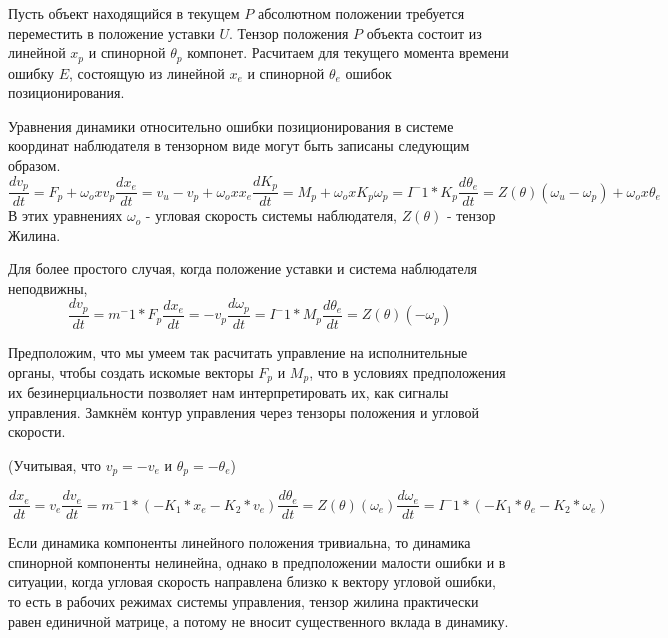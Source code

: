 \documentclass[a4paper]{article}
\begin{document}
Пусть объект находящийся в текущем $P$ абсолютном положении требуется переместить в положение уставки $U$.
Тензор положения $P$ объекта состоит из линейной $x_p$ и спинорной $\theta_p$ компонет. Расчитаем для текущего момента времени ошибку $E$, состоящую из линейной $x_e$ и спинорной $\theta_e$ ошибок позиционирования.

Уравнения динамики относительно ошибки позиционирования в системе координат наблюдателя в тензорном виде могут быть записаны следующим образом.
\begin{equation}
\frac{dv_p}{dt} = F_p  + \omega_o x v_p
\frac{dx_e}{dt} = v_u - v_p + \omega_o x x_e

\frac{dK_p}{dt} = M_p + \omega_o x K_p
\omega_p = I^-1 * K_p
\frac{d\theta_e}{dt} = Z(\theta)(\omega_u - \omega_p) + \omega_o x \theta_e
\end{equation}
В этих уравнениях $\omega_o$ - угловая скорость системы наблюдателя, $Z(\theta)$ - тензор Жилина. 

Для более простого случая, когда положение уставки и система наблюдателя неподвижны,   
\begin{equation}
\frac{dv_p}{dt} = m^-1 * F_p
\frac{dx_e}{dt} = - v_p

\frac{d\omega_p}{dt} = I^-1 * M_p
\frac{d\theta_e}{dt} = Z(\theta)(- \omega_p)
\end{equation}

Предположим, что мы умеем так расчитать управление на исполнительные органы, чтобы создать искомые векторы $F_p$ и $M_p$, что в условиях предположения их безинерциальности позволяет нам интерпретировать их, как сигналы управления. Замкнём контур управления через тензоры положения и угловой скорости.

(Учитывая, что $v_p = -v_e$ и $\theta_p = -\theta_e$)

 \begin{equation}
\frac{dx_e}{dt} = v_e
\frac{dv_e}{dt} = m^-1 * (-K_1*x_e -K_2*v_e)

\frac{d\theta_e}{dt} = Z(\theta)(\omega_e)
\frac{d\omega_e}{dt} = I^-1 * (-K_1*\theta_e -K_2*\omega_e)
\end{equation}

Если динамика компоненты линейного положения тривиальна, то динамика спинорной компоненты нелинейна, однако в предположении малости ошибки и в ситуации, когда угловая скорость направлена близко к вектору угловой ошибки, то есть в рабочих режимах системы управления, тензор жилина практически равен единичной матрице, а потому не вносит существенного вклада в динамику. 
\end{document}
